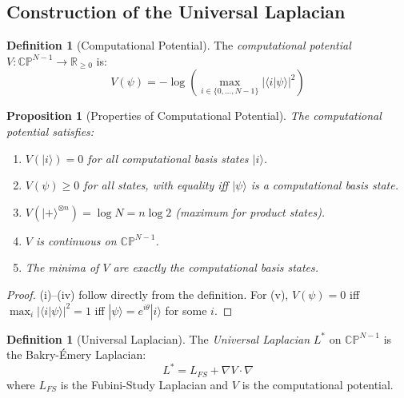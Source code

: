 \documentclass[11pt,a4paper]{article}
\theoremstyle{plain}
\newtheorem{proposition}[theorem]{Proposition}
\theoremstyle{definition}
\newtheorem{definition}[theorem]{Definition}
\theoremstyle{remark}
\newcommand{\R}{\mathbb{R}}
\newcommand{\CP}{\mathbb{CP}}
\newcommand{\ket}[1]{|#1\rangle}
\newcommand{\braket}[2]{\langle#1|#2\rangle}
\begin{document}
\subsection{Construction of the Universal Laplacian}

\begin{definition}[Computational Potential]
The \emph{computational potential} $V : \CP^{N-1} \to \R_{\geq 0}$ is:
\begin{equation}
    V(\psi) = -\log\left(\max_{i \in \{0,\ldots,N-1\}} |\braket{i}{\psi}|^2\right)
\end{equation}
\end{definition}

\begin{proposition}[Properties of Computational Potential]\label{prop:V-properties}
The computational potential satisfies:
\begin{enumerate}[label=(\roman*),noitemsep]
    \item $V(\ket{i}) = 0$ for all computational basis states $\ket{i}$.
    \item $V(\psi) \geq 0$ for all states, with equality iff $\ket{\psi}$ is a computational basis state.
    \item $V(\ket{+}^{\otimes n}) = \log N = n \log 2$ (maximum for product states).
    \item $V$ is continuous on $\CP^{N-1}$.
    \item The minima of $V$ are exactly the computational basis states.
\end{enumerate}
\end{proposition}

\begin{proof}
(i)--(iv) follow directly from the definition. For (v), $V(\psi) = 0$ iff $\max_i |\braket{i}{\psi}|^2 = 1$ iff $\ket{\psi} = e^{i\theta}\ket{i}$ for some $i$.
\end{proof}

\begin{definition}[Universal Laplacian]\label{def:universal-laplacian}
The \emph{Universal Laplacian} $L^*$ on $\CP^{N-1}$ is the Bakry-\'Emery Laplacian:
\begin{equation}\label{eq:universal-laplacian}
    \boxed{L^* = L_{FS} + \nabla V \cdot \nabla}
\end{equation}
where $L_{FS}$ is the Fubini-Study Laplacian and $V$ is the computational potential.
\end{definition}
\end{document}

